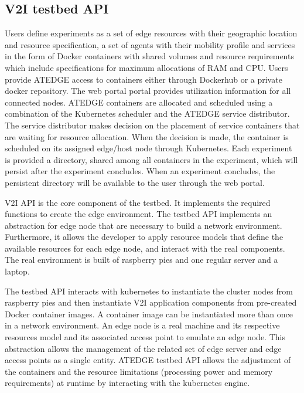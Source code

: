 \documentclass[conference]{IEEEtran}
\begin{document}
\subsection{V2I testbed API}
\par Users define experiments as a set of edge resources with their geographic location and resource specification, a set of agents with their mobility profile and services in the form of Docker containers with shared volumes and resource requirements which include specifications for maximum allocations of RAM and CPU. 
Users provide ATEDGE access to containers either through Dockerhub or a private docker repository. The web portal portal provides utilization information for all connected nodes. ATEDGE containers are allocated and scheduled using a combination of the Kubernetes scheduler and the ATEDGE service distributor.
The service distributor makes decision on the placement of service containers that are waiting for resource allocation. When the decision is made, the container is scheduled on its assigned edge/host node through Kubernetes. Each experiment is provided a directory, shared among all containers in the experiment, which will persist after the experiment concludes. When an experiment concludes, the persistent directory will be available to the user through the web
portal.

\par V2I API is the core component of the testbed. It implements the required functions to create the edge environment. The testbed API implements an abstraction for edge node that are necessary to build a network environment. Furthermore, it allows the developer to apply resource models that
define the available resources for each edge node, and interact with the real components. The real environment is built of raspberry pies and one regular server and a laptop. 
\par The testbed API interacts with kubernetes to instantiate the cluster nodes from raspberry pies and then instantiate V2I application components from pre-created Docker container images. A container image can be instantiated more than once in a network environment. An edge node is a real machine and its respective resources model and its associated access point to emulate an edge node. This abstraction allows the management of the related set of edge server and edge access points as a single entity. ATEDGE testbed API allows the adjustment of the containers and the resource limitations (processing power and memory requirements) at runtime by interacting with the kubernetes engine. 
\end{document}
